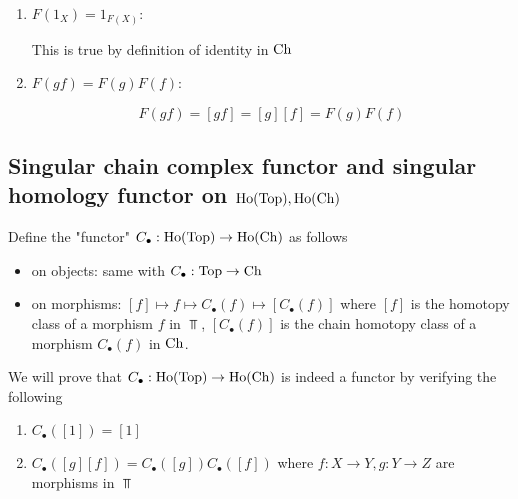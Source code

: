 \documentclass{article}
\begin{document}
\begin{longproof}

\begin{enumerate}
    \item $F(1_X) = 1_{F(X)}$:

    This is true by definition of identity in $\operatorname{Ch}$
    
    \item $F(gf) = F(g)F(f)$:

    $$
        F(gf) = [gf] = [g][f] = F(g) F(f)
    $$
\end{enumerate}
\end{longproof}

\subsection{Singular chain complex functor and singular homology functor on $\operatorname{Ho}(\operatorname{Top}), \operatorname{Ho}(\operatorname{Ch})$}

\begin{center}
\end{center}

Define the "functor" $C_\bullet: \operatorname{Ho}(\operatorname{Top}) \to \operatorname{Ho}(\operatorname{Ch})$ as follows
\begin{itemize}
    \item on objects: same with $C_\bullet: \operatorname{Top} \to \operatorname{Ch}$
    \item on morphisms: $[f] \mapsto f \mapsto C_\bullet(f) \mapsto [C_\bullet(f)]$ where $[f]$ is the homotopy class of a morphism $f$ in $\Top$, $[C_\bullet(f)]$ is the chain homotopy class of a morphism $C_\bullet(f)$ in $\operatorname{Ch}$.
\end{itemize}

We will prove that $C_\bullet: \operatorname{Ho}(\operatorname{Top}) \to \operatorname{Ho}(\operatorname{Ch})$ is indeed a functor by verifying the following

\begin{enumerate}
    \item $C_\bullet([1]) = [1]$
    \item $C_\bullet([g][f]) = C_\bullet([g]) C_\bullet([f])$ where $f: X \to Y, g: Y \to Z$ are morphisms in $\Top$
\end{enumerate}
\end{document}
